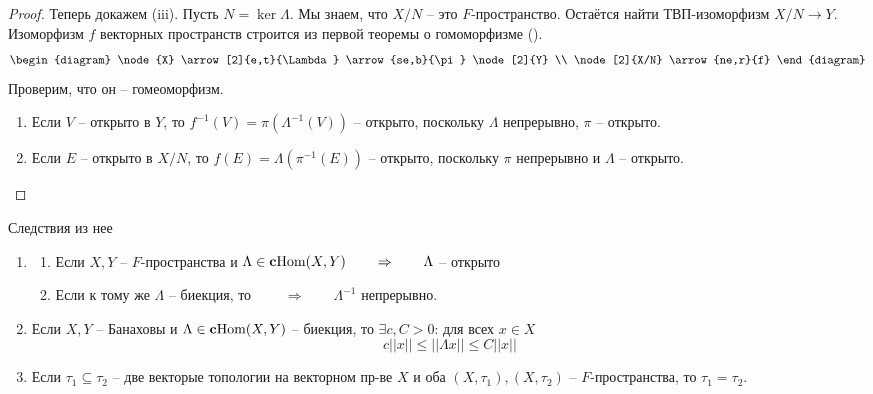 \documentclass[12pt, a4paper, oneside]{book}
\begin{document}
\begin{proof}
    Теперь докажем (iii). Пусть $N = \ker \Lambda$. Мы знаем, что $X/N$ -- это $F$-пространство. Остаётся найти ТВП-изоморфизм $X/N \to Y$.
    Изоморфизм $f$ векторных пространств строится из первой теоремы о гомоморфизме (\smiley).
   \[ \begin{diagram}
\node{X} \arrow[2]{e,t}{\Lambda}
\arrow{se,b}{\pi}
\node[2]{Y} \\
\node[2]{X/N} \arrow{ne,r}{f}
\end{diagram}\]
    Проверим, что он -- гомеоморфизм.
\begin{enumerate}
    \item Если $V$ -- открыто в $Y$, то $f^{-1}(V) = \pi(\Lambda^{-1}(V))$ -- открыто, поскольку $\Lambda$ непрерывно, $\pi$ -- открыто.
    \item Если $E$ -- открыто в $X/N$, то $f(E) = \Lambda(\pi^{-1}(E))$ -- открыто, поскольку $\pi$ непрерывно и $\Lambda$ -- открыто.
\end{enumerate}

\end{proof}

\begin{center}
    \Large Следствия из нее
\end{center}

\begin{enumerate}
    \item \begin{enumerate}
        \item Если $X,Y$ -- $F$-пространства и $\Lambda \in \text{\textbf{c}Hom}(X,Y) \qquad \Rightarrow \qquad \Lambda$ -- открыто
        \item Если к тому же $\Lambda$ -- биекция, то $\qquad \Rightarrow \qquad \Lambda^{-1}$ непрерывно.
    \end{enumerate}

    \item Если $X,Y$ -- Банаховы и $\Lambda \in \text{\textbf{c}Hom}(X,Y)$ -- биекция, то $\exists c,C > 0$: для всех $x \in X$
    $$c||x|| \leqslant ||\Lambda x|| \leqslant C||x||$$
    \item  Если $\tau_1\subseteq \tau_2$ -- две векторые топологии на векторном пр-ве $X$ и оба $(X,\tau_1), (X,\tau_2)$ -- $F$-пространства, то $\tau_1 = \tau_2$.
\end{enumerate}
\end{document}
